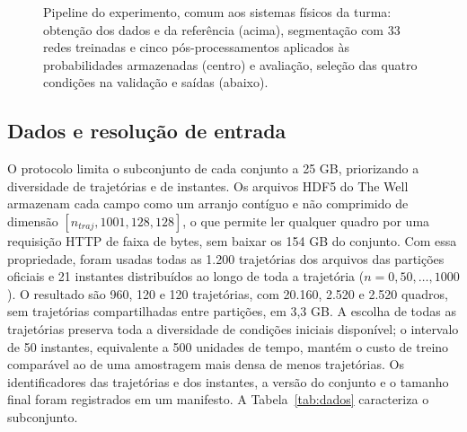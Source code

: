 \documentclass[12pt]{article}
\begin{document}
\begin{figure}[htbp]
{}
\caption{Pipeline do experimento, comum aos sistemas físicos da turma: obtenção dos dados e da referência (acima), segmentação com 33 redes treinadas e cinco pós-processamentos aplicados às probabilidades armazenadas (centro) e avaliação, seleção das quatro condições na validação e saídas (abaixo).}
\label{fig:pipeline}
\end{figure}

\subsection{Dados e resolução de entrada}
\label{subsec:dados}

O protocolo limita o subconjunto de cada conjunto a 25 GB, priorizando a diversidade de trajetórias e de instantes. Os arquivos HDF5 do The Well armazenam cada campo como um arranjo contíguo e não comprimido de dimensão $[n_{traj},1001,128,128]$, o que permite ler qualquer quadro por uma requisição HTTP de faixa de bytes, sem baixar os 154 GB do conjunto. Com essa propriedade, foram usadas todas as 1.200 trajetórias dos arquivos das partições oficiais e 21 instantes distribuídos ao longo de toda a trajetória ($n=0,50,\dots,1000$). O resultado são 960, 120 e 120 trajetórias, com 20.160, 2.520 e 2.520 quadros, sem trajetórias compartilhadas entre partições, em 3,3 GB. A escolha de todas as trajetórias preserva toda a diversidade de condições iniciais disponível; o intervalo de 50 instantes, equivalente a 500 unidades de tempo, mantém o custo de treino comparável ao de uma amostragem mais densa de menos trajetórias. Os identificadores das trajetórias e dos instantes, a versão do conjunto e o tamanho final foram registrados em um manifesto. A Tabela~\ref{tab:dados} caracteriza o subconjunto.
\end{document}
